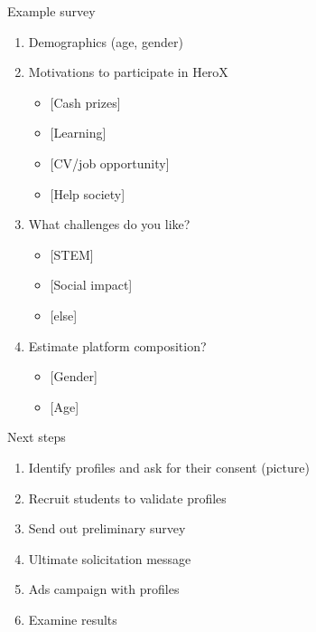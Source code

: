 \begin{frame}{Example survey}

\begin{enumerate}
\def\labelenumi{\arabic{enumi}.}
\tightlist
\item
  Demographics (age, gender)
\item
  Motivations to participate in HeroX

  \begin{itemize}
  \tightlist
  \item
    {[}Cash prizes{]}
  \item
    {[}Learning{]}
  \item
    {[}CV/job opportunity{]}
  \item
    {[}Help society{]}
  \end{itemize}
\item
  What challenges do you like?

  \begin{itemize}
  \tightlist
  \item
    {[}STEM{]}
  \item
    {[}Social impact{]}
  \item
    {[}else{]}
  \end{itemize}
\item
  Estimate platform composition?

  \begin{itemize}
  \tightlist
  \item
    {[}Gender{]}
  \item
    {[}Age{]}
  \end{itemize}
\end{enumerate}

\end{frame}

\begin{frame}{Next steps}

\begin{enumerate}
\def\labelenumi{\arabic{enumi}.}
\tightlist
\item
  Identify profiles and ask for their consent (picture)
\item
  Recruit students to validate profiles
\item
  Send out preliminary survey
\item
  Ultimate solicitation message
\item
  Ads campaign with profiles
\item
  Examine results
\end{enumerate}

\end{frame}

